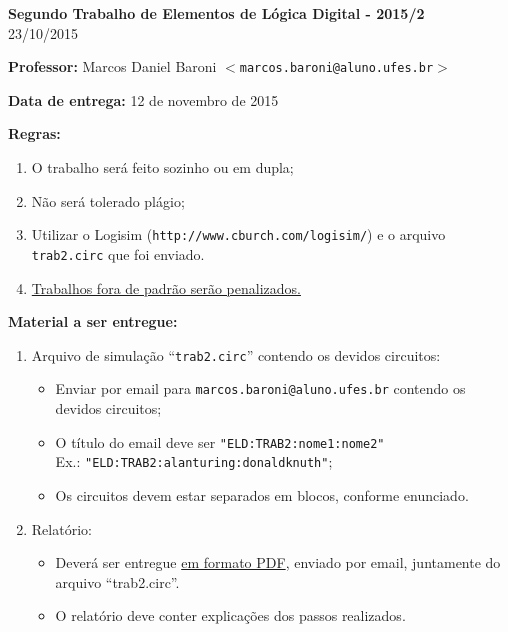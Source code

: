 \documentclass[8pt]{article}
\newcommand{\titulo}[1]{{\bf #1}}
\begin{document}

\begin{center}
{\Large \bf Segundo Trabalho de Elementos de Lógica Digital - 2015/2}
\\
23/10/2015
\vspace{5mm}
\end{center}

\noindent
\titulo{Professor:} Marcos Daniel Baroni $<$\texttt{marcos.baroni@aluno.ufes.br}$>$

\noindent
\titulo{Data de entrega:} 12 de novembro de 2015

\noindent
\titulo{Regras:}
\begin{enumerate}
  \item O trabalho será feito sozinho ou em dupla;
  \item Não será tolerado plágio;
  \item Utilizar o Logisim (\texttt{http://www.cburch.com/logisim/}) e o arquivo
    \texttt{trab2.circ} que foi enviado.
  \item \underline{Trabalhos fora de padrão serão penalizados.}
\end{enumerate}


\noindent
\titulo{Material a ser entregue:}
\begin{enumerate}
  \item{Arquivo de simulação ``\texttt{trab2.circ}'' contendo os devidos circuitos:}
  \begin{itemize}
	\item{Enviar por email para \texttt{marcos.baroni@aluno.ufes.br} contendo os devidos circuitos;}
	\item{O título do email deve ser \texttt{"ELD:TRAB2:nome1:nome2"} \\ { Ex.: \texttt{"ELD:TRAB2:alanturing:donaldknuth"}};}
	\item{Os circuitos devem estar separados em blocos, conforme enunciado. }
  \end{itemize}
  \item{Relatório:}
  \begin{itemize}
	\item{Deverá ser entregue \underline{em formato PDF}, enviado por email, juntamente do arquivo ``trab2.circ''.}
    \item{O relatório deve conter explicações dos passos realizados.}
  \end{itemize}
\end{enumerate}
\end{document}

